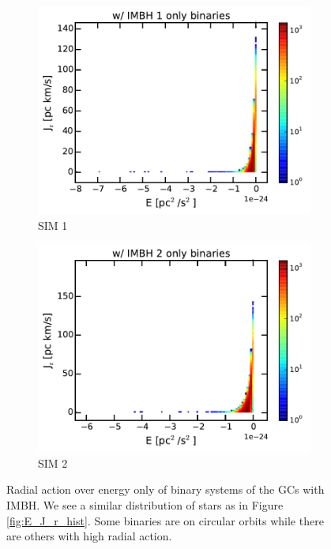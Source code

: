 \begin{figure}[htbp]
\centering
	\begin{subfigure}{0.475\textwidth}
		\includegraphics[width=\textwidth]{Plots/E_J_r_hist_bins_IMBH1.pdf}
		\caption{SIM 1}
		\label{fig:E_J_r_hist_bins_IMBH1}
	\end{subfigure}
	\hfill
	\begin{subfigure}{0.475\textwidth}
		\includegraphics[width=\textwidth]{Plots/E_J_r_hist_bins_IMBH2.pdf}
		\caption{SIM 2}
		\label{fig:E_J_r_hist_bins_IMBH2}
	\end{subfigure}
	\caption{Radial action over energy only of binary systems of the \acp{GC} with \ac{IMBH}. We see a similar distribution of stars as in Figure \ref{fig:E_J_r_hist}. Some binaries are on circular orbits while there are others with high radial action.}
	\label{fig:E_J_r_bins_hist}
\end{figure}

